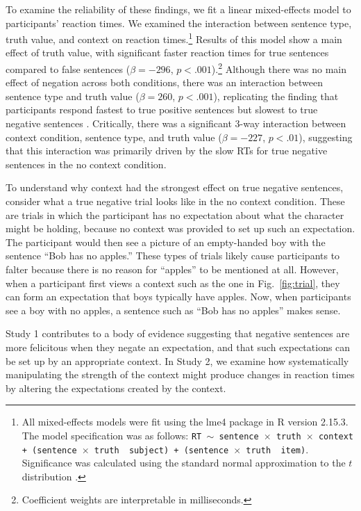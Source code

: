 \documentclass[10pt,letterpaper]{article}
\begin{document}
To examine the reliability of these findings, we fit a linear mixed-effects model to participants' reaction times.  We examined the interaction between sentence type, truth value, and context on reaction times.\footnote{All mixed-effects models were fit using the lme4 package in R version 2.15.3.  The model specification was as follows: \texttt{RT $\sim$ sentence~$\times$~truth~$\times$~context + (sentence~$\times$~truth~\textbar~subject) +  (sentence~$\times$~truth~\textbar~item)}.  Significance was calculated using the standard normal approximation to the $t$ distribution \cite{barr2013}.}  Results of this model show a main effect of truth value, with significant faster reaction times for true sentences compared to false sentences ($\beta= -296$, $p< .001$).\footnote{Coefficient weights are interpretable in milliseconds.}  Although there was no main effect of negation across both conditions, there was an interaction between sentence type and truth value ($\beta= 260$, $p< .001$), replicating the finding that participants respond fastest to true positive sentences but slowest to true negative sentences \cite{hclark1972}.  Critically, there was a significant 3-way interaction between context condition, sentence type, and truth value ($\beta= -227$, $p< .01$), suggesting that this interaction was primarily driven by the slow RTs for true negative sentences in the no context condition.  

To understand why context had the strongest effect on true negative sentences, consider what a true negative trial looks like in the no context condition.  These are trials in which the participant has no expectation about what the character might be holding, because no context was provided to set up such an expectation.  The participant would then see a picture of an empty-handed boy with the sentence ``Bob has no apples.''  These types of trials likely cause participants to falter because there is no reason for ``apples'' to be mentioned at all.  However, when a participant first views a context such as the one in Fig.\ \ref{fig:trial}, they can form an expectation that boys typically have apples.  Now, when participants see a boy with no apples, a sentence such as ``Bob has no apples'' makes sense.

Study 1 contributes to a body of evidence suggesting that negative sentences are more felicitous when they negate an expectation, and that such expectations can be set up by an appropriate context.  In Study 2, we examine how systematically manipulating the strength of the context might produce changes in reaction times by altering the expectations created by the context.  
\end{document}
